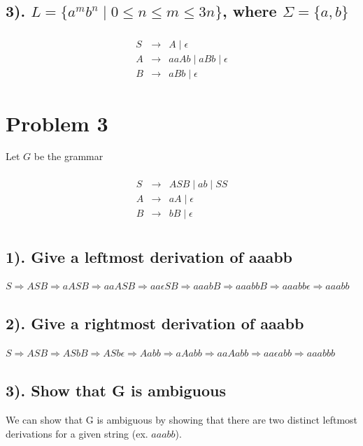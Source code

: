 \documentclass[20pt]{article} %
\begin{document}
\subsection{3). $L = \{a^{m}b^{n} \mid 0 \leq n \leq m \leq 3n\}$, where $\Sigma = \{a,b\}$}
 \begin{table}[!htbp]
 \[\begin{array}{ccc} 
&  \\
 S & \rightarrow & A \mid \epsilon \\
 A & \rightarrow & aaAb \mid aBb \mid \epsilon \\
 B & \rightarrow & aBb \mid \epsilon
 \end{array}\]
 \end{table}
\section{Problem 3}
Let $G$ be the grammar
 \begin{table}[!htbp]
 \[\begin{array}{ccc} 
&  \\
 S & \rightarrow & ASB \mid ab \mid SS\\
 A & \rightarrow & aA \mid \epsilon \\
 B & \rightarrow  & bB \mid \epsilon \\
 \end{array}\]
 \end{table}
\subsection{1). Give a leftmost derivation of aaabb}
$S \Rightarrow ASB \Rightarrow aASB \Rightarrow aaASB \Rightarrow aa\epsilon SB \Rightarrow aaabB \Rightarrow aaabbB \Rightarrow aaabb\epsilon \Rightarrow aaabb$
\subsection{2). Give a rightmost derivation of aaabb}
$S \Rightarrow ASB \Rightarrow ASbB \Rightarrow ASb\epsilon \Rightarrow Aabb \Rightarrow aAabb \Rightarrow aaAabb \Rightarrow aa\epsilon abb \Rightarrow aaabbb$
\newpage
\subsection{3). Show that G is ambiguous}
We can show that G is ambiguous by showing that there are two distinct leftmost derivations for a given string (ex. $aaabb$).  \\
\end{document}
